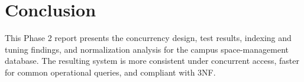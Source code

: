 \documentclass[12pt,a4paper]{article}
\begin{document}
\section{Conclusion}
This Phase 2 report presents the concurrency design, test results, indexing and tuning findings, and normalization analysis for the campus space-management database. The resulting system is more consistent under concurrent access, faster for common operational queries, and compliant with 3NF.
\end{document}
